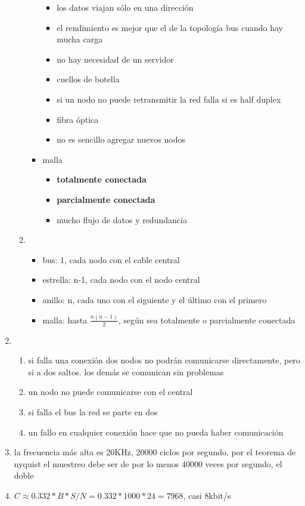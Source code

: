 \documentclass[11pt]{article}
\begin{document}
\begin{enumerate}
\begin{enumerate}
\begin{itemize}
\begin{itemize}
\item los datos viajan sólo en una dirección
\item el rendimiento es mejor que el de la topología bus cuando hay mucha carga
\item no hay necesidad de un servidor
\item cuellos de botella
\item si un nodo no puede retransmitir la red falla si es half duplex
\item fibra óptica
\item no es sencillo agregar nuevos nodos
\end{itemize}
\item malla
\begin{itemize}
\item \textbf{totalmente conectada}
\item \textbf{parcialmente conectada}
\item mucho flujo de datos y redundancia
\end{itemize}
\end{itemize}
\item \begin{itemize}
\item bus: 1, cada nodo con el cable central
\item estrella: n-1, cada nodo con el nodo central
\item anillo: n, cada uno con el siguiente y el último con el primero
\item malla: hasta \(\frac{n(n-1)}{2}\), según sea totalmente o parcialmente conectada
\end{itemize}
\end{enumerate}
\item \begin{enumerate}
\item si falla una conexión dos nodos no podrán comunicarse directamente, pero si a dos saltos. los demás se comunican sin problemas
\item un nodo no puede comunicarse con el central
\item si falla el bus la red se parte en dos
\item un fallo en cualquier conexión hace que no pueda haber comunicación
\end{enumerate}
\item la frecuencia más alta es 20KHz, 20000 ciclos por segundo. por el teorema de nyquist el muestreo debe ser de por lo menos 40000 veces por segundo, el doble
\item \(C\approx 0.332*B*S/N=0.332*1000*24=7968\), casi 8kbit/s

\end{enumerate}
\end{document}
